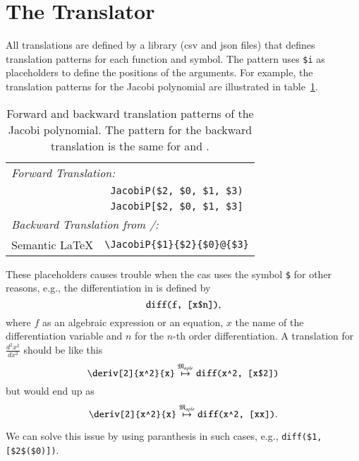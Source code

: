 \section{The Translator}
All translations are defined by a library (\gls*{csv} and \gls*{json} files) that defines translation patterns for each function and symbol. The pattern uses \verb|$i| as placeholders to define the positions of the arguments. For example, the translation patterns for the Jacobi polynomial are illustrated in table~\ref{tab:placeholder_ex2}.

\begin{table}[ht]
	\centering
	\begin{tabular}{lc}
		\hline
		\multicolumn{2}{l}{\textit{Forward Translation:}} \\
		\Maple & \verb|JacobiP($2, $0, $1, $3)| \\
		\Mathematica & \verb|JacobiP[$2, $0, $1, $3]|\\
		\hline
		\multicolumn{2}{l}{\textit{Backward Translation from \Maple/\Mathematica:}} \\
		Semantic \LaTeX & \verb|\JacobiP{$1}{$2}{$0}@{$3}|\\
		\hline
	\end{tabular}
	\caption{Forward and backward translation patterns of the Jacobi polynomial. The pattern for the backward translation is the same for \Maple{} and \Mathematica.}
	\label{tab:placeholder_ex2}
\end{table}

These placeholders causes trouble when the \gls*{cas} uses the symbol \verb|$| for other reasons, e.g., the differentiation in \Maple{} is defined by
\begin{equation*}
\verb|diff(f, [x$n])|,
\end{equation*}
where $f$ as an algebraic expression or an equation, $x$ the name of the differentiation variable and $n$ for the $n$-th order differentiation. A translation for $\frac{d^2x^2}{dx^2}$ should be like this
\begin{equation*}
\verb|\deriv[2]{x^2}{x}| \overset{\langMaple}{\mapsto} \verb|diff(x^2, [x$2])|
\end{equation*}
but would end up as
\begin{equation*}
\verb|\deriv[2]{x^2}{x}| \overset{\langMaple}{\mapsto} \verb|diff(x^2, [xx])|.
\end{equation*}

We can solve this issue by using paranthesis in such cases, e.g., \verb|diff($1, [$2$($0)])|.


